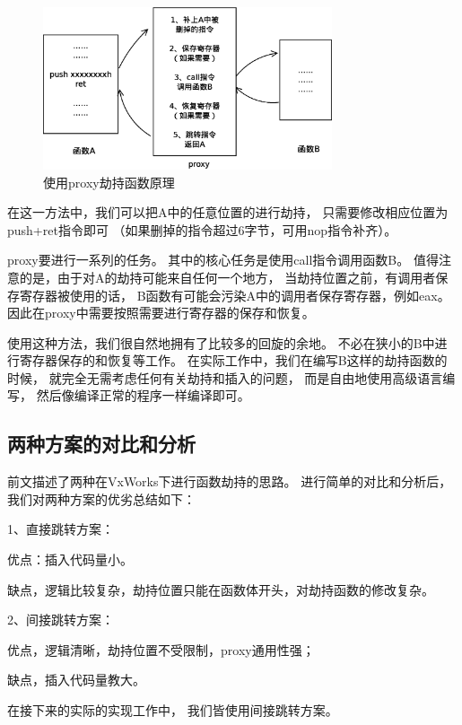 \begin{figure}[h!]
    \centering
    \includegraphics[width=0.76\textwidth]{figure/ab2.eps}
    \caption{使用proxy劫持函数原理}
    \label{ab2}
\end{figure}

在这一方法中，我们可以把A中的任意位置的进行劫持，
只需要修改相应位置为push+ret指令即可
（如果删掉的指令超过6字节，可用nop指令补齐）。

proxy要进行一系列的任务。
其中的核心任务是使用call指令调用函数B。
值得注意的是，由于对A的劫持可能来自任何一个地方，
当劫持位置之前，有调用者保存寄存器被使用的话，
B函数有可能会污染A中的调用者保存寄存器，例如eax。
因此在proxy中需要按照需要进行寄存器的保存和恢复。


使用这种方法，我们很自然地拥有了比较多的回旋的余地。
不必在狭小的B中进行寄存器保存的和恢复等工作。
在实际工作中，我们在编写B这样的劫持函数的时候，
就完全无需考虑任何有关劫持和插入的问题，
而是自由地使用高级语言编写，
然后像编译正常的程序一样编译即可。

\subsection{两种方案的对比和分析}

前文描述了两种在VxWorks下进行函数劫持的思路。
进行简单的对比和分析后，我们对两种方案的优劣总结如下：

1、直接跳转方案：

优点：插入代码量小。

缺点，逻辑比较复杂，劫持位置只能在函数体开头，对劫持函数的修改复杂。

2、间接跳转方案：

优点，逻辑清晰，劫持位置不受限制，proxy通用性强；

缺点，插入代码量教大。

在接下来的实际的实现工作中，
我们皆使用间接跳转方案。







